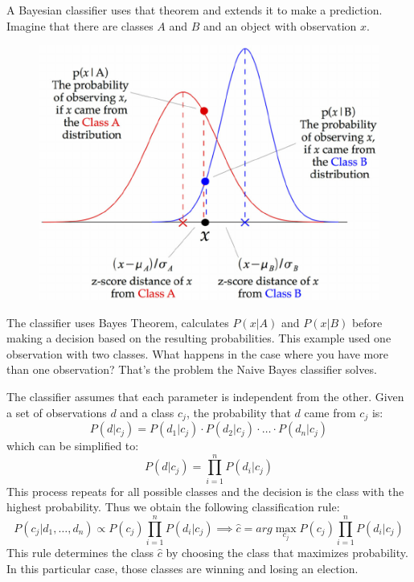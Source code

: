 \documentclass[11pt, twoside, reqno]{article}
\begin{document}
A Bayesian classifier uses that theorem and extends it to make a prediction. Imagine that there are classes $A$ and $B$ and an object with observation $x$. 
\begin{figure}[H]
\centering
	\includegraphics[scale=0.5]{bayes}
\end{figure}
The classifier uses Bayes Theorem, calculates $P(x|A)$ and $P(x|B)$ before making a decision based on the resulting probabilities. This example used one observation with two classes. What happens in the case where you have more than one observation? That's the problem the Naive Bayes classifier solves. 

The classifier assumes that each parameter is independent from the other. Given a set of observations $d$ and a class $c_j$, the probability that $d$ came from $c_j$ is:
\begin{equation}
\label{eq:naivebayes}
P(d|c_j) = P(d_1|c_j) \cdot P(d_2|c_j) \cdot \ldots \cdot P(d_n|c_j)
\end{equation}
which can be simplified to:
\begin{equation}
\label{eq:simnaivebayes}
P(d|c_j) = \prod^{n}_{i=1} P(d_i|c_j)
\end{equation}
This process repeats for all possible classes and the decision is the class with the highest probability. Thus we obtain the following classification rule:
\begin{equation}
\label{eq:classrule}
P(c_j | d_1,\dots,d_n) \propto P(c_j) \prod^{n}_{i=1} P(d_i | c_j) \implies \hat{c} = arg\max_{c_j}P(c_j)\prod^{n}_{i=1}P(d_i | c_j)
\end{equation}
This rule determines the class $\hat{c}$ by choosing the class that maximizes probability. In this particular case, those classes are winning and losing an election. 
\end{document}
